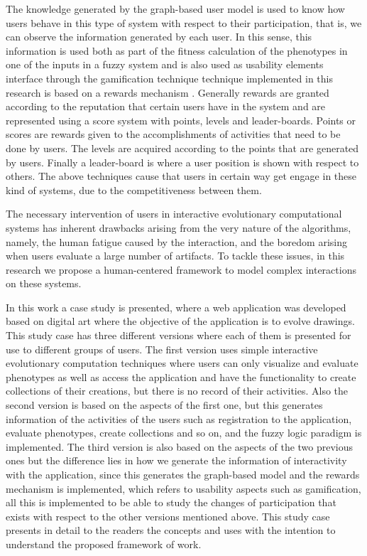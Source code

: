 \par The knowledge generated by the graph-based user model is used to know how users
behave in this type of system with respect to their participation, that is, we
can observe the information generated by each user. In this sense, this
information is used both as part of the fitness calculation of the phenotypes in
one of the inputs in a fuzzy system and is also used as usability elements
interface through the gamification technique\cite{huotari2012defining}\cite{deterding2011game}\cite{hickman2010total}\cite{mcgonigal2011reality} technique
implemented in this research is based on a rewards mechanism \cite{sutter2010browse}.
Generally rewards are granted according to the reputation that certain users
have in the system and are represented using a score system with points, levels and
leader-boards. Points or scores are rewards given to the accomplishments of
activities that need to be done by users. The levels are acquired according to
the points that are generated by users. Finally a leader-board is where a user position
is shown with respect to others. The above
techniques cause that users in certain way get engage in these kind of
systems, due to the competitiveness between them.


\par The necessary intervention of users in interactive evolutionary computational
systems has inherent drawbacks arising from the very nature of the algorithms,
namely, the human fatigue caused by the interaction, and the boredom arising
when users evaluate a large number of artifacts. To tackle these issues, in this
research we propose a human-centered framework to model complex interactions on
these systems.

\par In this work a case study is presented, where a web application was
developed based on digital art where the objective of the application is to
evolve drawings. This study case has three different versions where each of them
is presented for use to different groups of users. The first version uses simple
interactive evolutionary computation techniques where users can only visualize
and evaluate phenotypes as well as access the application and have the
functionality to create collections of their creations, but there is no record
of their activities. Also the second version is based on the aspects of the
first one, but this generates information of the activities of the users such as
registration to the application, evaluate phenotypes, create collections and so
on, and the fuzzy logic paradigm is implemented. The third version is also
based on the aspects of the two previous ones but the difference lies in how we
generate the information of interactivity with the application, since this
generates the graph-based model and the rewards mechanism is implemented, which
refers to usability aspects such as gamification, all this is implemented to be
able to study the changes of participation that exists with respect to the other
versions mentioned above. This study case presents in detail to the readers the
concepts and uses with the intention to understand the proposed framework of work. 


